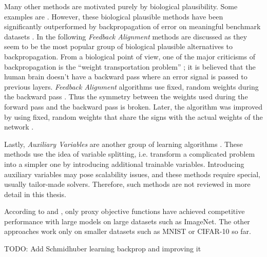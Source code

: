 Many other methods are motivated purely by biological plausibility.
Some examples are \cite{10.5555.3157096.3157213, Lillicrap_Cownden_Tweed_Akerman_2016, Xiao_Chen_Liao_Poggio_2019, aaai.BalduzziVB15, 10.5555/3016100.3016156}.
However, these biological plausible methods have been significantly outperformed by backpropagation of error on meaningful benchmark datasets .
In the following \emph{Feedback Alignment} methods are discussed as they seem to be the most popular group of biological plausible alternatives to backpropagation.
From a biological point of view, one of the major criticisms of backpropagation is the ``weight transportation problem'' ; it is believed that the human brain doesn't have a backward pass where an error signal is passed to previous layers.
\emph{Feedback Alignment} algorithms use fixed, random weights during the backward pass \cite{Lillicrap_Cownden_Tweed_Akerman_2016}.
Thus the symmetry between the weights used during the forward pass and the backward pass is broken.
Later, the algorithm was improved by using fixed, random weights that share the signs with the actual weights of the network .

Lastly, \emph{Auxiliary Variables} are another group of learning algorithms \cite{pmlr-v33-carreira-perpinan14, 10.5555/3045390.3045677, 10.5555/3294771.3294935, Lau_Zeng_Wu_Yao_2018}.
These methods use the idea of variable splitting, i.e. transform a complicated problem into a simpler one by introducing additional trainable variables.
Introducing auxiliary variables may pose scalability issues, and these methods require special, usually tailor-made solvers.
Therefore, such methods are not reviewed in more detail in this thesis.

According to  and , only proxy objective functions have achieved competitive performance with large models on large datasets such as ImageNet.
The other approaches work only on smaller datasets such as MNIST or CIFAR-10 so far.


TODO: Add Schmidhuber learning backprop and improving it



